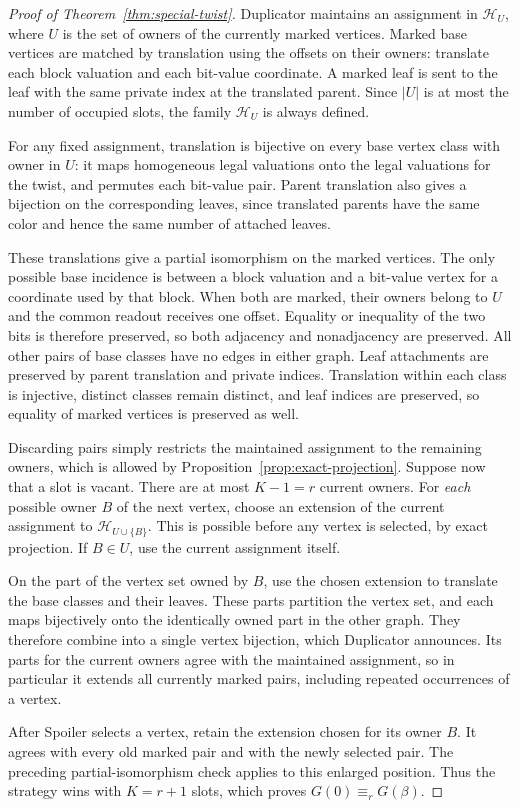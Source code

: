 \begin{proof}[Proof of Theorem~\ref{thm:special-twist}]
Duplicator maintains an assignment in $\mathcal H_U$, where $U$ is
the set of owners of the currently marked vertices. Marked base
vertices are matched by translation using the offsets on their
owners: translate each block valuation and each bit-value coordinate.
A marked leaf is sent to the leaf with the same private index at the
translated parent. Since $|U|$ is at most the number of occupied slots,
the family $\mathcal H_U$ is always defined.

For any fixed assignment, translation is bijective on every base
vertex class with owner in $U$: it maps homogeneous legal valuations
onto the legal valuations for the twist, and permutes each bit-value
pair. Parent translation also gives a bijection on the corresponding
leaves, since translated parents have the same color and hence the
same number of attached leaves.

These translations give a partial isomorphism on the marked vertices.
The only possible base incidence is between a block valuation and a
bit-value vertex for a coordinate used by that block. When both are
marked, their owners belong to $U$ and the common readout receives
one offset. Equality or inequality of the two bits is therefore
preserved, so both adjacency and nonadjacency are preserved. All other
pairs of base classes have no edges in either graph. Leaf attachments
are preserved by parent translation and private indices. Translation
within each class is injective, distinct classes remain distinct, and
leaf indices are preserved, so equality of marked vertices is
preserved as well.

Discarding pairs simply restricts the maintained assignment to the
remaining owners, which is allowed by
Proposition~\ref{prop:exact-projection}. Suppose now that a slot is
vacant. There are at most $K-1=r$ current owners. For \emph{each}
possible owner $B$ of the next vertex, choose an extension of the
current assignment to $\mathcal H_{U\cup\{B\}}$. This is possible
before any vertex is selected, by exact projection. If $B\in U$, use
the current assignment itself.

On the part of the vertex set owned by $B$, use the chosen extension
to translate the base classes and their leaves. These parts partition
the vertex set, and each maps bijectively onto the identically owned
part in the other graph. They therefore combine into a single vertex
bijection, which Duplicator announces. Its parts for the current
owners agree with the maintained assignment, so in particular it
extends all currently marked pairs, including repeated occurrences of
a vertex.

After Spoiler selects a vertex, retain the extension chosen for its
owner $B$. It agrees with every old marked pair and with the newly
selected pair. The preceding partial-isomorphism check applies to
this enlarged position. Thus the strategy wins with $K=r+1$ slots,
which proves $G(0)\equiv_r G(\beta)$.
\end{proof}
